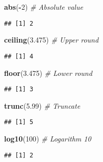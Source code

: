 \documentclass[
]{book}
\newenvironment{Shaded}{\begin{snugshade}}{\end{snugshade}}
\newcommand{\CommentTok}[1]{\textcolor[rgb]{0.56,0.35,0.01}{\textit{#1}}}
\newcommand{\DecValTok}[1]{\textcolor[rgb]{0.00,0.00,0.81}{#1}}
\newcommand{\FloatTok}[1]{\textcolor[rgb]{0.00,0.00,0.81}{#1}}
\newcommand{\KeywordTok}[1]{\textcolor[rgb]{0.13,0.29,0.53}{\textbf{#1}}}
\newcommand{\NormalTok}[1]{#1}
\newcommand{\OperatorTok}[1]{\textcolor[rgb]{0.81,0.36,0.00}{\textbf{#1}}}
\begin{document}
\begin{Shaded}
\begin{Highlighting}[]
\KeywordTok{abs}\NormalTok{(}\OperatorTok{-}\DecValTok{2}\NormalTok{) }\CommentTok{# Absolute value}
\end{Highlighting}
\end{Shaded}

\begin{verbatim}
## [1] 2
\end{verbatim}

\begin{Shaded}
\begin{Highlighting}[]
\KeywordTok{ceiling}\NormalTok{(}\FloatTok{3.475}\NormalTok{) }\CommentTok{# Upper round}
\end{Highlighting}
\end{Shaded}

\begin{verbatim}
## [1] 4
\end{verbatim}

\begin{Shaded}
\begin{Highlighting}[]
\KeywordTok{floor}\NormalTok{(}\FloatTok{3.475}\NormalTok{) }\CommentTok{# Lower round}
\end{Highlighting}
\end{Shaded}

\begin{verbatim}
## [1] 3
\end{verbatim}

\begin{Shaded}
\begin{Highlighting}[]
\KeywordTok{trunc}\NormalTok{(}\FloatTok{5.99}\NormalTok{) }\CommentTok{# Truncate}
\end{Highlighting}
\end{Shaded}

\begin{verbatim}
## [1] 5
\end{verbatim}

\begin{Shaded}
\begin{Highlighting}[]
\KeywordTok{log10}\NormalTok{(}\DecValTok{100}\NormalTok{) }\CommentTok{# Logarithm 10}
\end{Highlighting}
\end{Shaded}

\begin{verbatim}
## [1] 2
\end{verbatim}
\end{document}
